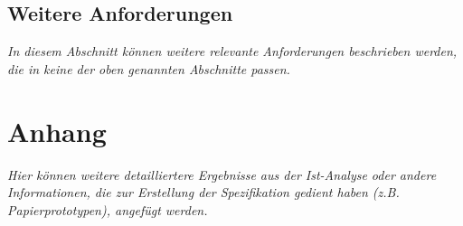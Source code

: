\documentclass[fontsize=12pt,paper=a4,twoside]{scrartcl}
\begin{document}
\subsection{Weitere Anforderungen}


{\em In diesem Abschnitt können weitere relevante Anforderungen
  beschrieben werden, die in keine der oben genannten Abschnitte
  passen.}

\section{Anhang}


{\em Hier können weitere detailliertere Ergebnisse aus der Ist-Analyse
  oder andere Informationen, die zur Erstellung der Spezifikation
  gedient haben (z.B. Papierprototypen), angefügt werden.}
\end{document}
